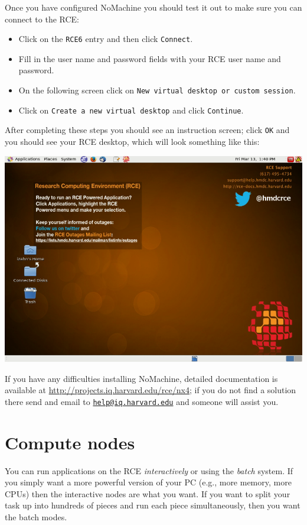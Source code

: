 \documentclass[
]{book}
\providecommand{\tightlist}{%
  \setlength{\itemsep}{0pt}\setlength{\parskip}{0pt}}
\begin{document}
Once you have configured NoMachine you should test it out to make sure
you can connect to the RCE:

\begin{itemize}
\tightlist
\item
  Click on the \texttt{RCE6} entry and then click \texttt{Connect}.
\item
  Fill in the user name and password fields with your RCE user name and password.
\item
  On the following screen click on \texttt{New\ virtual\ desktop\ or\ custom\ session}.
\item
  Click on \texttt{Create\ a\ new\ virtual\ desktop} and click \texttt{Continue}.
\end{itemize}

After completing these steps you should see an instruction screen; click
\texttt{OK} and you should see your RCE desktop, which will look something like
this:

\includegraphics{images/rceDesktop.png}

If you have any difficulties installing NoMachine, detailed
documentation is available at \url{http://projects.iq.harvard.edu/rce/nx4};
if you do not find a solution there send and email to
\href{mailto:help@iq.harvard.edu}{\nolinkurl{help@iq.harvard.edu}} and someone will assist you.

\hypertarget{compute-nodes}{%
\section{Compute nodes}\label{compute-nodes}}

You can run applications on the RCE \emph{interactively} or using the \emph{batch}
system. If you simply want a more powerful version of your PC (e.g.,
more memory, more CPUs) then the interactive nodes are what you want. If
you want to split your task up into hundreds of pieces and run each
piece simultaneously, then you want the batch modes.
\end{document}
